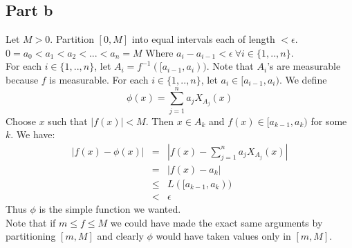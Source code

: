 \documentclass[12pt]{article}
\begin{document}
\subsection*{Part b}
Let $M >0$. Partition $[0,M]$ into equal intervals each of length $< \epsilon$.\\
 $0=a_0 < a_1 < a_2 <... < a_n=M$ Where $a_i-a_{i-1}<\epsilon \ \forall i \in \{1,..,n\}$.\\
For each $i \in \{1,..,n\}$, let $A_i = f^{-1}([a_{i-1},a_i))$. Note that $A_i$'s are measurable because $f$ is measurable. For each $i \in \{1,..,n\}$, let $a_i \in [a_{i-1},a_i)$. We define
$$\phi (x) = \sum_{j=1}^n a_j X_{A_j} (x)$$
Choose $x$ such that $|f(x)|<M$. Then $x \in A_k$ and $f(x) \in [a_{k-1},a_k)$ for some $k$. We have:
\begin{eqnarray*}
|f(x)-\phi(x)| &=& |f(x)-\sum_{j=1}^n a_j X_{A_j} (x)|
\\ &=&
|f(x)-a_k| \\ &\le & L([a_{k-1},a_k))
\\ &< &
\epsilon
\end{eqnarray*}
Thus $\phi$ is the simple function we wanted. \\
Note that if $m \le f \le M$ we could have made the exact same arguments by partitioning $[m,M]$ and clearly $\phi$ would have taken values only in $[m,M]$.

\clearpage
\end{document}
